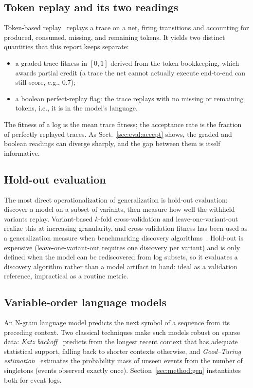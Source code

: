 \documentclass[runningheads]{llncs}
\begin{document}
\subsection{Token replay and its two readings}
\label{sec:background:replay}
Token-based replay~\cite{rozinat2008conformance} replays a trace on a net, firing transitions and accounting for produced, consumed, missing, and remaining tokens. It yields two distinct quantities that this report keeps separate:
\begin{itemize}
  \item a graded trace fitness in $[0,1]$ derived from the token bookkeeping, which awards partial credit (a trace the net cannot actually execute end-to-end can still score, e.g., $0.7$);
  \item a boolean perfect-replay flag: the trace replays with no missing or remaining tokens, i.e., it is in the model's language.
\end{itemize}
The fitness of a log is the mean trace fitness; the acceptance rate is the fraction of perfectly replayed traces. As Sect.~\ref{sec:eval:accept} shows, the graded and boolean readings can diverge sharply, and the gap between them is itself informative.

\subsection{Hold-out evaluation}
The most direct operationalization of generalization is hold-out evaluation: discover a model on a subset of variants, then measure how well the withheld variants replay. Variant-based $k$-fold cross-validation and leave-one-variant-out realize this at increasing granularity, and cross-validation fitness has been used as a generalization measure when benchmarking discovery algorithms~\cite{augusto2019benchmark}. Hold-out is expensive (leave-one-variant-out requires one discovery per variant) and is only defined when the model can be rediscovered from log subsets, so it evaluates a discovery algorithm rather than a model artifact in hand: ideal as a validation reference, impractical as a routine metric.

\subsection{Variable-order language models}
An N-gram language model predicts the next symbol of a sequence from its preceding context. Two classical techniques make such models robust on sparse data: \emph{Katz backoff}~\cite{katz1987} predicts from the longest recent context that has adequate statistical support, falling back to shorter contexts otherwise, and \emph{Good--Turing estimation}~\cite{gale1995gt} estimates the probability mass of unseen events from the number of singletons (events observed exactly once). Section~\ref{sec:method:gen} instantiates both for event logs.
\end{document}
